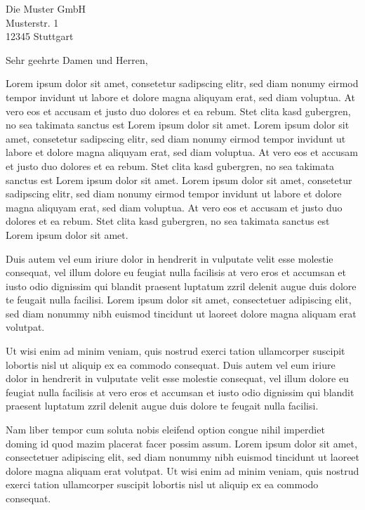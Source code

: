 \documentclass%
  [fontsize=11pt,%
   paper=a4,%
   headsepline=off,%
   parskip=half,%
   fromalign=right,%
   fromphone=on,%
   fromrule=aftername,%
   fromfax=off,%
   fromemail=on,%
   fromurl=off,%
   fromlogo=on,%
   addrfield=on,%
   backaddress=on,%
   subject=beforeopening,%
   locfield=narrow,%
   foldmarks=off,%
   numericaldate=off,%
   refline=narrow,%
   firstfoot=on,%
   draft=off%
]{scrlttr2}
\begin{document}
\begin{letter}
{
Die Muster GmbH\\
Musterstr. 1\\
12345 Stuttgart\\
}


\opening{Sehr geehrte Damen und Herren,}

Lorem ipsum dolor sit amet, consetetur sadipscing elitr, sed diam nonumy eirmod tempor invidunt ut labore et dolore magna aliquyam erat, sed diam voluptua. At vero eos et accusam et justo duo dolores et ea rebum. Stet clita kasd gubergren, no sea takimata sanctus est Lorem ipsum dolor sit amet. Lorem ipsum dolor sit amet, consetetur sadipscing elitr, sed diam nonumy eirmod tempor invidunt ut labore et dolore magna aliquyam erat, sed diam voluptua. At vero eos et accusam et justo duo dolores et ea rebum. Stet clita kasd gubergren, no sea takimata sanctus est Lorem ipsum dolor sit amet. Lorem ipsum dolor sit amet, consetetur sadipscing elitr, sed diam nonumy eirmod tempor invidunt ut labore et dolore magna aliquyam erat, sed diam voluptua. At vero eos et accusam et justo duo dolores et ea rebum. Stet clita kasd gubergren, no sea takimata sanctus est Lorem ipsum dolor sit amet.   

Duis autem vel eum iriure dolor in hendrerit in vulputate velit esse molestie consequat, vel illum dolore eu feugiat nulla facilisis at vero eros et accumsan et iusto odio dignissim qui blandit praesent luptatum zzril delenit augue duis dolore te feugait nulla facilisi. Lorem ipsum dolor sit amet, consectetuer adipiscing elit, sed diam nonummy nibh euismod tincidunt ut laoreet dolore magna aliquam erat volutpat.   

Ut wisi enim ad minim veniam, quis nostrud exerci tation ullamcorper suscipit lobortis nisl ut aliquip ex ea commodo consequat. Duis autem vel eum iriure dolor in hendrerit in vulputate velit esse molestie consequat, vel illum dolore eu feugiat nulla facilisis at vero eros et accumsan et iusto odio dignissim qui blandit praesent luptatum zzril delenit augue duis dolore te feugait nulla facilisi.   

Nam liber tempor cum soluta nobis eleifend option congue nihil imperdiet doming id quod mazim placerat facer possim assum. Lorem ipsum dolor sit amet, consectetuer adipiscing elit, sed diam nonummy nibh euismod tincidunt ut laoreet dolore magna aliquam erat volutpat. Ut wisi enim ad minim veniam, quis nostrud exerci tation ullamcorper suscipit lobortis nisl ut aliquip ex ea commodo consequat.   


\end{letter}
\end{document}
